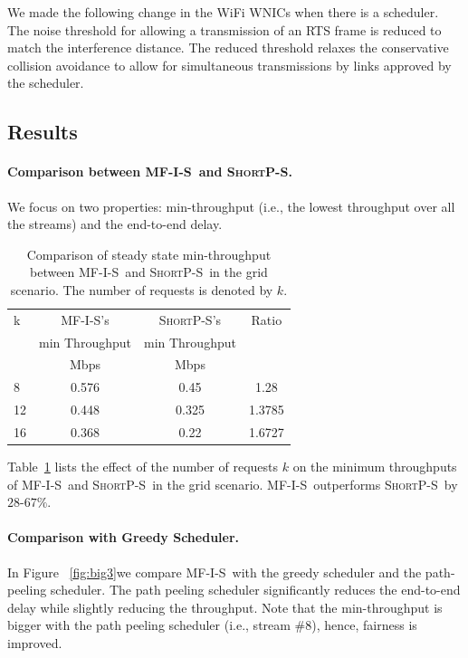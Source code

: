 \documentclass[12pt]{article}
\newenvironment{proof sketch}[1]{\noindent {\emph{Proof sketch of #1:}}}{\hfill \qed}
\newcommand{\algA}{\textsc{MF-I-S}}
\newcommand{\algBS}{\textsc{ShortP-S}}
\begin{document}
We made the following change in the WiFi WNICs when there is a
scheduler. The noise threshold for allowing a transmission of an RTS
frame is reduced to match the interference distance. The reduced
threshold relaxes the conservative collision avoidance to allow for
simultaneous transmissions by links approved by the scheduler.

\subsection{Results}

\paragraph{Comparison between \algA\ and \algBS .}
We focus on two properties: min-throughput (i.e., the lowest throughput
over all the streams) and the end-to-end delay.
\begin{table}
\centering \scriptsize
\begin{tabular}{|| l || c | c | c ||}
\hline
k & \algA 's            & \algBS 's & Ratio\\
    &  min Throughput   & min Throughput & \\
\hline
& Mbps & Mbps & \\
\hline\hline
8 & 0.576 & 0.45  & 1.28  \\
12 & 0.448 & 0.325 & 1.3785 \\
16 & 0.368  & 0.22 & 1.6727 \\
\hline
\end{tabular}
\caption{Comparison of steady state min-throughput between \algA\ and \algBS\ in the
  grid scenario.  The number of requests is denoted by $k$. }
\label{tab:minthroughput}
\end{table}

Table~\ref{tab:minthroughput} lists the effect of the number of
requests $k$  on the minimum throughputs of \algA\ and \algBS\ in the
grid scenario.  \algA\ outperforms \algBS\ by $28$-$67\%$.

\paragraph{Comparison with Greedy Scheduler.}
In Figure%
~\ref{fig:big3}we compare \algA\ with the greedy scheduler
and the path-peeling scheduler.  The path peeling scheduler
significantly reduces the end-to-end delay while slightly reducing the
throughput. Note that the min-throughput is bigger with the
path peeling scheduler (i.e., stream \#8), hence, fairness is
improved.
\end{document}
